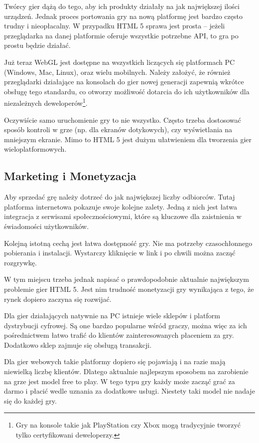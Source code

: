 Twórcy gier dążą do tego, aby ich produkty działały na jak największej ilości urządzeń. Jednak
proces portowania gry na nową platformę jest bardzo często trudny i nieopłacalny. W przypadku
HTML 5 sprawa jest prosta -- jeżeli przeglądarka na danej platformie oferuje wszystkie potrzebne
API, to gra po prostu będzie działać.

Już teraz WebGL jest dostępne na wszystkich liczących się platformach PC (Windows, Mac, Linux),
oraz wielu mobilnych. Należy założyć, że również przeglądarki działające na konsolach do gier nowej
generacji zapewnią wkrótce obsługę tego standardu, co otworzy możliwość dotarcia do ich użytkowników
dla niezależnych deweloperów\footnote{Gry na konsole takie jak PlayStation czy Xbox mogą tradycyjnie tworzyć
tylko certyfikowani deweloperzy.}.

Oczywiście samo uruchomienie gry to nie wszystko. Często trzeba dostosować sposób kontroli w grze
(np. dla ekranów dotykowych), czy wyświetlania na mniejszym ekranie. Mimo to HTML 5 jest dużym ułatwieniem
dla tworzenia gier wieloplatformowych.

\subsection{Marketing i Monetyzacja}

Aby sprzedać grę należy dotrzeć do jak największej liczby odbiorców. Tutaj platforma internetowa pokazuje
swoje kolejne
zalety. Jedną z nich jest łatwa integracja z serwisami społecznościowymi, które są kluczowe
dla zaistnienia w świadomości użytkowników.

Kolejną istotną cechą jest łatwa dostępność gry. Nie ma potrzeby czasochłonnego pobierania i instalacji.
Wystarczy kliknięcie w link i po chwili można zacząć rozgrywkę.

W tym miejscu trzeba jednak napisać o prawdopodobnie aktualnie największym problemie gier HTML 5.
Jest nim trudność monetyzacji gry wynikająca z tego, że rynek dopiero zaczyna się rozwijać.

Dla gier działających natywnie na PC istnieje wiele sklepów i platform dystrybucji cyfrowej. Są one
bardzo popularne wśród graczy, można więc za ich pośrednictwem łatwo trafić do klientów
zainteresowanych płaceniem za gry. Dodatkowo sklep zajmuje się obsługą transakcji.

Dla gier webowych takie platformy dopiero się pojawiają i na razie mają niewielką liczbę klientów.
Dlatego aktualnie najlepszym sposobem na zarobienie na grze jest model free to play. W tego typu
gry każdy może zacząć grać za darmo i płacić wedle uznania za dodatkowe usługi. Niestety taki
model nie nadaje się do każdej gry.

